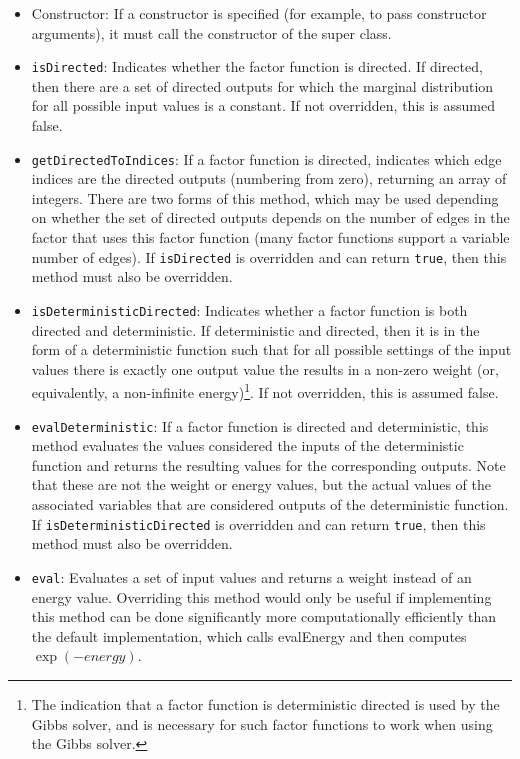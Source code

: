\begin{itemize}
%
\item Constructor: If a constructor is specified (for example, to pass constructor arguments), it must call the constructor of the super class.
%
\item \texttt{isDirected}: Indicates whether the factor function is directed.  If directed, then there are a set of directed outputs for which the marginal distribution for all possible input values is a constant.  If not overridden, this is assumed false.
%
\item \texttt{getDirectedToIndices}: If a factor function is directed, indicates which edge indices are the directed outputs (numbering from zero), returning an array of integers.  There are two forms of this method, which may be used depending on whether the set of directed outputs depends on the number of edges in the factor that uses this factor function (many factor functions support a variable number of edges).  If \texttt{isDirected} is overridden and can return \texttt{true}, then this method must also be overridden.
%
\item \texttt{isDeterministicDirected}: Indicates whether a factor function is both directed and deterministic.  If deterministic and directed, then it is in the form of a deterministic function such that for all possible settings of the input values there is exactly one output value the results in a non-zero weight (or, equivalently, a non-infinite energy)\footnote{The indication that a factor function is deterministic directed is used by the Gibbs solver, and is necessary for such factor functions to work when using the Gibbs solver.}.  If not overridden, this is assumed false.
%
\item \texttt{evalDeterministic}: If a factor function is directed and deterministic, this method evaluates the values considered the inputs of the deterministic function and returns the resulting values for the corresponding outputs.  Note that these are not the weight or energy values, but the actual values of the associated variables that are considered outputs of the deterministic function.  If \texttt{isDeterministicDirected} is overridden and can return \texttt{true}, then this method must also be overridden.
%
\item \texttt{eval}: Evaluates a set of input values and returns a weight instead of an energy value.  Overriding this method would only be useful if implementing this method can be done significantly more computationally efficiently than the default implementation, which calls evalEnergy and then computes $\exp(-energy)$.
%
\end{itemize}

